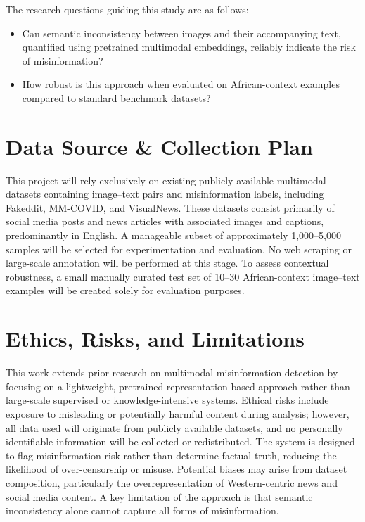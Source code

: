\documentclass[a4paper,10.5pt,twoside]{article}
\begin{document}
The research questions guiding this study are as follows:
\begin{itemize}
    \item Can semantic inconsistency between images and their accompanying text, quantified using pretrained multimodal embeddings, reliably indicate the risk of misinformation?
    \item How robust is this approach when evaluated on African-context examples compared to standard benchmark datasets?
\end{itemize}


\section{Data Source \& Collection Plan}

This project will rely exclusively on existing publicly available multimodal datasets containing image--text pairs and misinformation labels, including Fakeddit, MM-COVID, and VisualNews. These datasets consist primarily of social media posts and news articles with associated images and captions, predominantly in English. A manageable subset of approximately 1,000--5,000 samples will be selected for experimentation and evaluation. No web scraping or large-scale annotation will be performed at this stage. To assess contextual robustness, a small manually curated test set of 10--30 African-context image--text examples will be created solely for evaluation purposes.

\section{Ethics, Risks, and Limitations}

This work extends prior research on multimodal misinformation detection by focusing on a lightweight, pretrained representation-based approach rather than large-scale supervised or knowledge-intensive systems. Ethical risks include exposure to misleading or potentially harmful content during analysis; however, all data used will originate from publicly available datasets, and no personally identifiable information will be collected or redistributed. The system is designed to flag misinformation risk rather than determine factual truth, reducing the likelihood of over-censorship or misuse. Potential biases may arise from dataset composition, particularly the overrepresentation of Western-centric news and social media content. A key limitation of the approach is that semantic inconsistency alone cannot capture all forms of misinformation.
\end{document}
